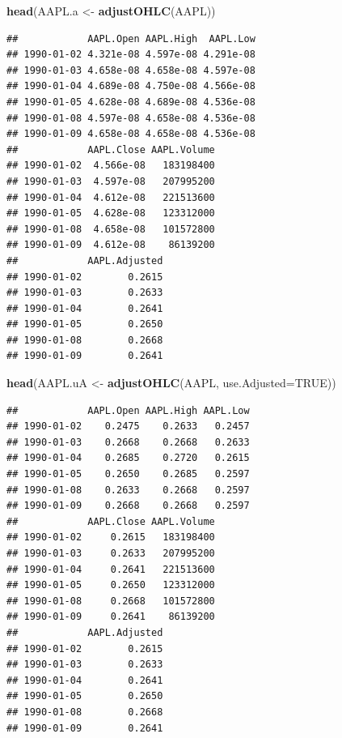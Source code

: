 \documentclass[]{ctexbook}
\newenvironment{Shaded}{\begin{snugshade}}{\end{snugshade}}
\newcommand{\AttributeTok}[1]{\textcolor[rgb]{0.13,0.29,0.53}{#1}}
\newcommand{\ConstantTok}[1]{\textcolor[rgb]{0.56,0.35,0.01}{#1}}
\newcommand{\FunctionTok}[1]{\textcolor[rgb]{0.13,0.29,0.53}{\textbf{#1}}}
\newcommand{\NormalTok}[1]{#1}
\newcommand{\OtherTok}[1]{\textcolor[rgb]{0.56,0.35,0.01}{#1}}
\begin{document}
\begin{Shaded}
\begin{Highlighting}[]
\FunctionTok{head}\NormalTok{(AAPL.a }\OtherTok{\textless{}{-}} \FunctionTok{adjustOHLC}\NormalTok{(AAPL))}
\end{Highlighting}
\end{Shaded}

\begin{verbatim}
##            AAPL.Open AAPL.High  AAPL.Low
## 1990-01-02 4.321e-08 4.597e-08 4.291e-08
## 1990-01-03 4.658e-08 4.658e-08 4.597e-08
## 1990-01-04 4.689e-08 4.750e-08 4.566e-08
## 1990-01-05 4.628e-08 4.689e-08 4.536e-08
## 1990-01-08 4.597e-08 4.658e-08 4.536e-08
## 1990-01-09 4.658e-08 4.658e-08 4.536e-08
##            AAPL.Close AAPL.Volume
## 1990-01-02  4.566e-08   183198400
## 1990-01-03  4.597e-08   207995200
## 1990-01-04  4.612e-08   221513600
## 1990-01-05  4.628e-08   123312000
## 1990-01-08  4.658e-08   101572800
## 1990-01-09  4.612e-08    86139200
##            AAPL.Adjusted
## 1990-01-02        0.2615
## 1990-01-03        0.2633
## 1990-01-04        0.2641
## 1990-01-05        0.2650
## 1990-01-08        0.2668
## 1990-01-09        0.2641
\end{verbatim}

\begin{Shaded}
\begin{Highlighting}[]
\FunctionTok{head}\NormalTok{(AAPL.uA }\OtherTok{\textless{}{-}} \FunctionTok{adjustOHLC}\NormalTok{(AAPL, }\AttributeTok{use.Adjusted=}\ConstantTok{TRUE}\NormalTok{))}
\end{Highlighting}
\end{Shaded}

\begin{verbatim}
##            AAPL.Open AAPL.High AAPL.Low
## 1990-01-02    0.2475    0.2633   0.2457
## 1990-01-03    0.2668    0.2668   0.2633
## 1990-01-04    0.2685    0.2720   0.2615
## 1990-01-05    0.2650    0.2685   0.2597
## 1990-01-08    0.2633    0.2668   0.2597
## 1990-01-09    0.2668    0.2668   0.2597
##            AAPL.Close AAPL.Volume
## 1990-01-02     0.2615   183198400
## 1990-01-03     0.2633   207995200
## 1990-01-04     0.2641   221513600
## 1990-01-05     0.2650   123312000
## 1990-01-08     0.2668   101572800
## 1990-01-09     0.2641    86139200
##            AAPL.Adjusted
## 1990-01-02        0.2615
## 1990-01-03        0.2633
## 1990-01-04        0.2641
## 1990-01-05        0.2650
## 1990-01-08        0.2668
## 1990-01-09        0.2641
\end{verbatim}
\end{document}
